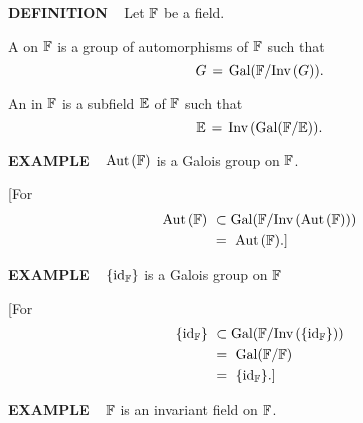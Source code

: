 \vspace{0.1cm}

\begin{x}{\small\bf DEFINITION} \ %
Let $\mathbb{F}$ be a field.

\qquad\qquad \textbullet \quad A 
on $\mathbb{F}$ is a group \mG of automorphisms of $\mathbb{F}$ such that 
\[
G \hspace{0.05cm} = \hspace{0.05cm} \text{Gal}(\mathbb{F}/\text{Inv}\hspace{0.05cm}(G)).
\]

\vspace{0.1cm}

\qquad\qquad \textbullet \quad An 
in $\mathbb{F}$ is a subfield $\mathbb{E}$ of $\mathbb{F}$ such that 
\[
\mathbb{E} \hspace{0.05cm} = \hspace{0.05cm} \text{Inv}\hspace{0.05cm}(\text{Gal}(\mathbb{F}/\mathbb{E})).
\]

\vspace{0.1cm}
\end{x}

\vspace{0.1cm}



\begin{x}{\small\bf EXAMPLE} \ %
$\text{Aut}\hspace{0.05 cm}(\mathbb{F})$ is a Galois group on $\mathbb{F}$.

\vspace{0.1cm}

[For 
\begin{align*}
\Aut(\F) \ 
&\subset \Gal(\F/\Inv(\Aut(\F)))\\
&=\ \Aut(\F).]
\end{align*}
\end{x}

\vspace{0.1cm}


\begin{x}{\small\bf EXAMPLE} \ %
$\{\text{id}_{\mathbb{F}}\}$ is a Galois group on $\mathbb{F}$

\vspace{0.1cm}

[For 
\begin{align*}
\{\id_\F\} \ 
&\subset \Gal(\F/\Inv(\{\id_\F\}))\\
&=\ \Gal(\F/\F) \\
&=\ \{\id_\F\}.]
\end{align*}
\end{x}

\vspace{0.1cm}


\begin{x}{\small\bf EXAMPLE} \ %
$\mathbb{F}$ is an invariant field on $\mathbb{F}$.
\end{x}

